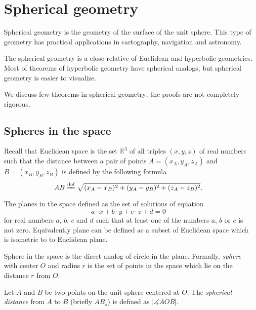 
\chapter{Spherical geometry}
\label{chap:sphere}

Spherical geometry is the geometry 
of the surface of the unit sphere.
This type of geometry has practical  applications in cartography, navigation  and astronomy.

The spherical geometry is a close relative of Euclidean and hyperbolic geometries.
Most of theorems of hyperbolic geometry have spherical analogs,
but spherical geometry is easier to visualize. 

We discuss few theorems in spherical geometry;
the proofs are not completely rigorous.

\section*{Spheres in the space}

Recall that Euclidean space is the set $\mathbb{R}^3$ of all triples $(x,y,z)$ of real numbers
such that the distance between a pair of points
$A=(x_A,y_A,z_A)$ and $B=(x_B,y_B,z_B)$
is defined by the following formula
$$AB
\df
\sqrt{(x_A-x_B)^2+(y_A-y_B)^2+(z_A-z_B)^2}.$$

The planes in the space defined as the set of solutions of equation 
$$a\cdot x+b\cdot y+c\cdot z+d=0$$ 
for real numbers $a$, $b$, $c$ and $d$ such that at least one of the numbers $a$, $b$ or $c$ is not zero.
Equivalently plane can be defined as a subset of Euclidean space which is isometric to to Euclidean plane.

Sphere in the space is the direct analog of circle in the plane.
Formally, \emph{sphere} with center $O$ and radius $r$ is the set of points in the space which lie on the distance $r$ from $O$.

Let $A$ and $B$ be two points on the unit sphere centered at $O$.
The \emph{spherical distance} from $A$ to $B$
(briefly $AB_s$)
 is defined as  $|\measuredangle AOB|$. 

